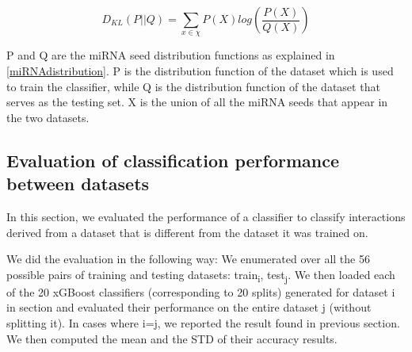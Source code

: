 \documentclass{bmcart}
\begin{document}
\begin{equation}
 D_{KL} \left (P ||Q \right ) = \sum_{x\in \chi }{P\left ( X \right )log\left ( \frac{P\left ( X \right )}{Q\left ( X \right )} \right )}\label{eq:1}
\end{equation}

P and Q are the miRNA seed distribution functions as explained in \ref{miRNAdistribution}. P is the distribution function of the dataset which is used to train the classifier, while Q is the distribution function of the dataset that serves as the testing set. X is the union of all the miRNA seeds that appear in the two datasets.

\subsection*{Evaluation of classification performance between datasets}
In this section, we evaluated the performance of a classifier to classify interactions derived from a dataset that is different from the dataset it was trained on. 


We did the evaluation in the following way: We enumerated over all the 56 possible pairs of training and testing datasets: train\textsubscript{i}, test\textsubscript{j}. We then loaded each of the 20 xGBoost classifiers (corresponding to 20 splits) generated for dataset i in section  and evaluated their performance on the entire dataset j (without splitting it). In cases where i=j,  we reported the result found in previous section. We then computed the mean and the STD of their accuracy results.




\end{document}
